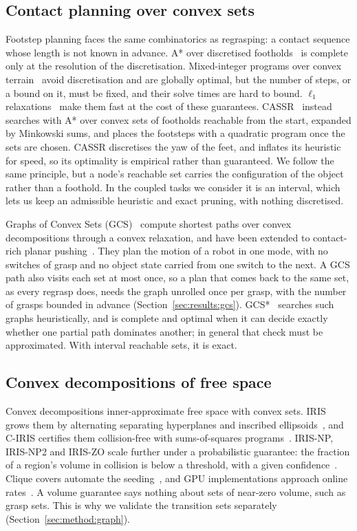 \subsection{Contact planning over convex sets}
Footstep planning faces the same combinatorics as regrasping: a contact
sequence whose length is not known in advance. A* over discretised footholds~\cite{griffin2019footstep}
is complete only at the resolution of the discretisation. Mixed-integer
programs over convex
terrain~\cite{deits2014footstep} avoid
discretisation and are globally optimal, but the number of steps, or a bound
on it, must be fixed, and their solve times are hard to bound. $\ell_1$
relaxations~\cite{tonneau2020sl1m} make them fast at the cost
of these guarantees.  CASSR~\cite{wang2026cassr} instead searches with A* over
convex sets of footholds reachable from the start, expanded by Minkowski sums,
and places the footsteps with a quadratic program once the sets are chosen.
CASSR discretises the yaw of the feet, and inflates its heuristic for speed,
so its optimality is empirical rather than guaranteed. We follow the same principle, but a node's
reachable set carries the configuration of the object rather than a foothold.
In the coupled tasks we consider it is an interval, which lets us keep an
admissible heuristic and exact pruning, with nothing discretised.

Graphs of Convex Sets (GCS)~\cite{marcucci2024shortest,marcucci2023motion}
compute shortest paths over convex decompositions through a convex relaxation,
and have been extended to contact-rich planar
pushing~\cite{graesdal2024tight}. They plan the motion of a robot in one mode,
with no switches of grasp and no object state carried from one switch to the
next. A GCS path also visits each set at most once, so a plan that comes back
to the same set, as every regrasp does, needs the graph unrolled once per
grasp, with the number of grasps bounded in advance
(Section~\ref{sec:results:gcs}). GCS*~\cite{chia2024gcsstar} searches such graphs heuristically, and is
complete and optimal when it can decide exactly whether one partial path
dominates another; in general that check must be approximated. With interval
reachable sets, it is exact.

\subsection{Convex decompositions of free space}
Convex decompositions inner-approximate free space with convex sets. IRIS
grows them by alternating separating hyperplanes and inscribed
ellipsoids~\cite{deits2015computing}, and C-IRIS certifies them collision-free
with sums-of-squares programs~\cite{dai2024certified}. IRIS-NP, IRIS-NP2 and
IRIS-ZO scale further under a probabilistic guarantee: the fraction of a
region's volume in collision is below a threshold, with a given
confidence~\cite{petersen2023growing,werner2024faster}. Clique covers automate
the seeding~\cite{werner2024approximating}, and GPU implementations approach
online rates~\cite{werner2025superfast}. A volume guarantee says nothing
about sets of near-zero volume, such as grasp sets. This is why we validate
the transition sets separately (Section~\ref{sec:method:graph}).
